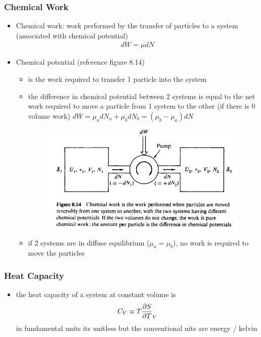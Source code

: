 \subsubsection{Chemical Work}
\begin{itemize}
    \item Chemical work: work performed by the transfer of particles to a system (associated with 
    chemical potential)
    \begin{align}
        dW = \mu dN 
    \end{align}
    \item Chemical potential (reference figure 8.14)
    \begin{itemize}
        \item is the work required to transfer 1 particle into the system 
        \item the difference in chemical potential between 2 systems is equal to the net work 
        required to move a particle from 1 system to the other (if there is 0 volume work)
        $dW = \mu_a dN_a + \mu_b dN_b = (\mu_b - \mu_a)dN$
        \begin{figure}[h]
            \centering
            \includegraphics[width=.75\textwidth]{Figures/chemical_work.png}
            \label{fig:chemical_work}
        \end{figure}
        \item if 2 systems are in diffuse equilibrium ($\mu_a = \mu_b$), no work is required to move 
        the particles
    \end{itemize}
\end{itemize}


\subsubsection{Heat Capacity}
\begin{itemize}
    \item the heat capacity of a system at constant volume is 
    \begin{align}
        C_V \equiv T \pdv{S}{T}_V
    \end{align}
    in fundamental units its unitless but the conventional nits are energy / kelvin 
\end{itemize}



